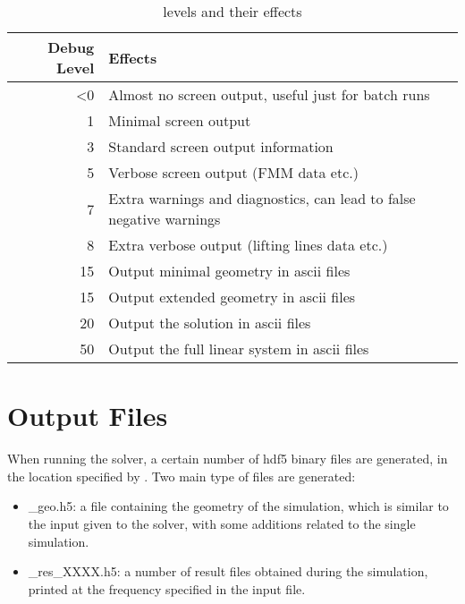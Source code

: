\begin{table}[]
\centering
\begin{tabular}{@{}rl@{}}
\toprule
Debug Level & Effects \\ \midrule
<0            & Almost no screen output, useful just for batch runs        \\
1             & Minimal screen output        \\
3             & Standard screen output information         \\ 
5             & Verbose screen output (FMM data etc.)\\
7             & Extra warnings and diagnostics, can lead to false negative warnings\\ 
8             & Extra verbose output (lifting lines data etc.)\\\midrule
15            & Output minimal geometry in ascii files \\
15            & Output extended geometry in ascii files \\
20            & Output the solution in ascii files \\
50            & Output the full linear system in ascii files\\
\bottomrule
\end{tabular}
\caption{ levels and their effects}
\label{tab:debug_level}
\end{table}

\section{Output Files}
\label{sec:Solver_Output_Files}

When running the solver, a certain number of hdf5 binary files are generated, in the location specified by . Two main type of files are generated:
\begin{itemize}
    \item {}\_geo.h5: a file containing the geometry of the simulation, which is similar to the input given to the solver, with some additions related to the single simulation.
    \item {}\_res\_XXXX.h5: a number of result files obtained during the simulation, printed at the frequency specified in the input file. 
\end{itemize}